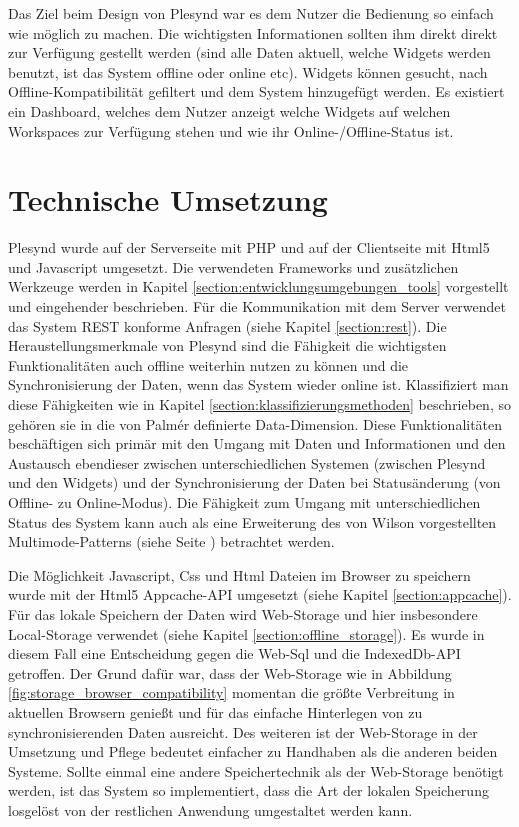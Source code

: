 Das Ziel beim Design von Plesynd war es dem Nutzer die Bedienung so einfach wie möglich zu machen. Die wichtigsten Informationen sollten ihm direkt direkt zur Verfügung gestellt werden (sind alle Daten aktuell, welche Widgets werden benutzt, ist das System offline oder online etc). Widgets können gesucht, nach Offline-Kompatibilität gefiltert und dem System hinzugefügt werden. Es existiert ein Dashboard, welches dem Nutzer anzeigt welche Widgets auf welchen Workspaces zur Verfügung stehen und wie ihr Online-/Offline-Status ist. 

\section{Technische Umsetzung}\label{section:technische_umsetzung}
Plesynd wurde auf der Serverseite mit PHP und auf der Clientseite mit Html5 und Javascript umgesetzt. Die verwendeten Frameworks und zusätzlichen Werkzeuge werden in Kapitel \ref{section:entwicklungsumgebungen_tools} vorgestellt und eingehender beschrieben. Für die Kommunikation mit dem Server verwendet das System REST konforme Anfragen (siehe Kapitel \ref{section:rest}). 
Die Heraustellungsmerkmale von Plesynd sind die Fähigkeit die wichtigsten Funktionalitäten auch offline weiterhin nutzen zu können und die Synchronisierung der Daten, wenn das System wieder online ist. Klassifiziert man diese Fähigkeiten wie in Kapitel \ref{section:klassifizierungsmethoden} beschrieben, so gehören sie in die von Palmér definierte Data-Dimension. Diese Funktionalitäten beschäftigen sich primär mit den Umgang mit Daten und Informationen und den Austausch ebendieser zwischen unterschiedlichen Systemen (zwischen Plesynd und den Widgets) und der Synchronisierung der Daten bei Statusänderung (von Offline- zu Online-Modus). Die Fähigkeit zum Umgang mit unterschiedlichen Status des System kann auch als eine Erweiterung des von Wilson vorgestellten Multimode-Patterns (siehe Seite \pageref{wilson_patterns:multimode}) betrachtet werden. 

Die Möglichkeit Javascript, Css und Html Dateien im Browser zu speichern wurde mit der Html5 Appcache-API umgesetzt (siehe Kapitel \ref{section:appcache}). Für das lokale Speichern der Daten wird Web-Storage und hier insbesondere Local-Storage verwendet (siehe Kapitel \ref{section:offline_storage}). Es wurde in diesem Fall eine Entscheidung gegen die Web-Sql und die IndexedDb-API getroffen. Der Grund dafür war, dass der Web-Storage wie in Abbildung \ref{fig:storage_browser_compatibility} momentan die größte Verbreitung in aktuellen Browsern genießt und für das einfache Hinterlegen von zu synchronisierenden Daten ausreicht. Des weiteren ist der Web-Storage in der Umsetzung und Pflege bedeutet einfacher zu Handhaben als die anderen beiden Systeme. Sollte einmal eine andere Speichertechnik als der Web-Storage benötigt werden, ist das System so implementiert, dass die Art der lokalen Speicherung losgelöst von der restlichen Anwendung umgestaltet werden kann.

